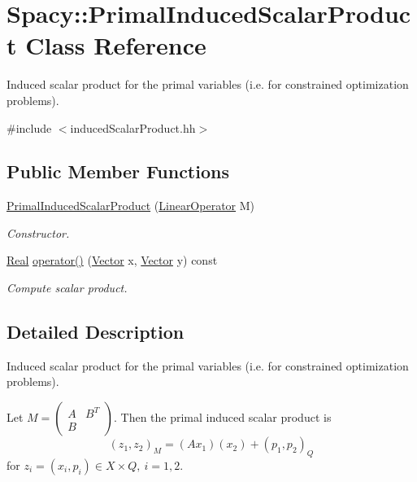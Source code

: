 \hypertarget{classSpacy_1_1PrimalInducedScalarProduct}{}\section{Spacy\+:\+:Primal\+Induced\+Scalar\+Product Class Reference}
\label{classSpacy_1_1PrimalInducedScalarProduct}


Induced scalar product for the primal variables (i.\+e. for constrained optimization problems).  




{\ttfamily \#include $<$induced\+Scalar\+Product.\+hh$>$}

\subsection*{Public Member Functions}
\begin{DoxyCompactItemize}
\item 
\hyperlink{classSpacy_1_1PrimalInducedScalarProduct_acfea3362a4d59ae0c689bd525870d830}{Primal\+Induced\+Scalar\+Product} (\hyperlink{classSpacy_1_1LinearOperator}{Linear\+Operator} M)
\begin{DoxyCompactList}\small\item\em Constructor. \end{DoxyCompactList}\item 
\hyperlink{classSpacy_1_1Real}{Real} \hyperlink{classSpacy_1_1PrimalInducedScalarProduct_a74ba39d9a97f3c782088493450c03a6b}{operator()} (\hyperlink{classSpacy_1_1Vector}{Vector} x, \hyperlink{classSpacy_1_1Vector}{Vector} y) const 
\begin{DoxyCompactList}\small\item\em Compute scalar product. \end{DoxyCompactList}\end{DoxyCompactItemize}


\subsection{Detailed Description}
Induced scalar product for the primal variables (i.\+e. for constrained optimization problems). 

Let $ M = \left( \begin{array}{ccc} A & B^T \\ B & \end{array} \right)$. Then the primal induced scalar product is \[ (z_1,z_2)_M = (Ax_1)(x_2) + (p_1,p_2)_Q \] for $z_i = (x_i,p_i)\in X\times Q,\ i=1,2$. 

